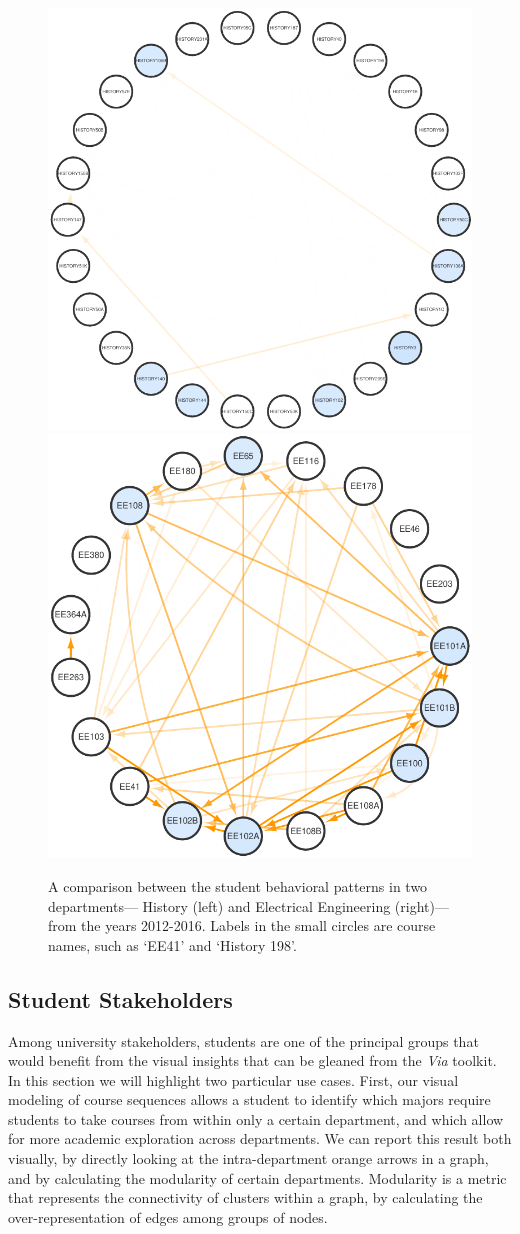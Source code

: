 \documentclass{sigchi}
\begin{document}
\begin{figure}
    \centering
    \includegraphics[width=0.55\columnwidth]{final-modularity-history.pdf}
    \includegraphics[width=0.44\columnwidth]{final-modularity-ee.pdf}
    \caption{A comparison between the student behavioral patterns in two departments--- History (left) and Electrical Engineering (right)---from the years 2012-2016. Labels in the small circles are course names, such as `EE41' and `History 198'.}
    \label{fig:modularity}
\end{figure}

\subsection{Student Stakeholders}
\label{sec:student_stakeholders}
Among university stakeholders, students are one of the principal
groups that would benefit from the visual insights that can be gleaned
from the \textit{Via} toolkit. In this section we will highlight two
particular use cases. First, our visual modeling of course sequences allows a student to identify which majors require students to take courses from within only a certain department, and which allow for more academic exploration across departments. We can report this result both visually, by directly looking at the intra-department orange arrows in a graph, and by calculating the modularity of certain departments. Modularity is a metric that represents the connectivity of clusters within a graph, by calculating the over-representation of edges among groups of nodes.
\end{document}

